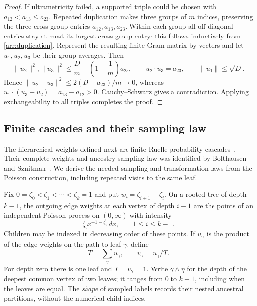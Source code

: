 \begin{proof}
If ultrametricity failed, a supported triple could be chosen with
$a_{12}<a_{13}\leq a_{23}$.  Repeated duplication makes three groups of
$m$ indices, preserving the three cross-group entries $a_{12},a_{13},a_{23}$.
Within each group all off-diagonal entries stay at most its largest
cross-group entry: this follows inductively from
\eqref{arr:duplication}.  Represent the resulting finite Gram matrix by
vectors and let $u_1,u_2,u_3$ be their group averages.  Then
\[
 \|u_2\|^2,\|u_3\|^2
 \leq \frac Dm+\left(1-\frac1m\right)a_{23},
 \qquad u_2\cdot u_3=a_{23},\qquad \|u_1\|\leq\sqrt D.
\]
Hence $\|u_2-u_3\|^2\leq2(D-a_{23})/m\to0$, whereas
$u_1\cdot(u_3-u_2)=a_{13}-a_{12}>0$.  Cauchy--Schwarz gives a
contradiction.  Applying exchangeability to all triples completes the
proof.
\end{proof}

\subsection{Finite cascades and their sampling law}

The hierarchical weights defined next are finite Ruelle probability
cascades~\cite{ruelle1987}. Their complete weights-and-ancestry sampling
law was identified by Bolthausen and Sznitman~\cite{bolthausensznitman1998}.
We derive the needed sampling and transformation laws from the Poisson
construction, including repeated visits to the same leaf.

Fix $0=\zeta_0<\zeta_1<\cdots<\zeta_k=1$ and put
$w_i=\zeta_{i+1}-\zeta_i$.  On a rooted tree of depth $k-1$, the outgoing
edge weights at each vertex of depth $i-1$ are the points of an independent
Poisson process on $(0,\infty)$ with intensity
\[
 \zeta_i x^{-1-\zeta_i}\,dx,\qquad 1\leq i\leq k-1.
\]
Children may be indexed in decreasing order of these points.  If $u_\gamma$
is the product of the edge weights on the path to leaf $\gamma$, define
\begin{equation}
 T=\sum_\gamma u_\gamma,
 \qquad v_\gamma=u_\gamma/T.
 \label{arr:cascade-weights}
\end{equation}
For depth zero there is one leaf and $T=v_\gamma=1$.  Write
$\gamma\wedge\eta$ for the depth of the deepest common vertex of two
leaves; it ranges from $0$ to $k-1$, including when the leaves are equal.
The \emph{shape} of sampled labels records their nested ancestral
partitions, without the numerical child indices.


